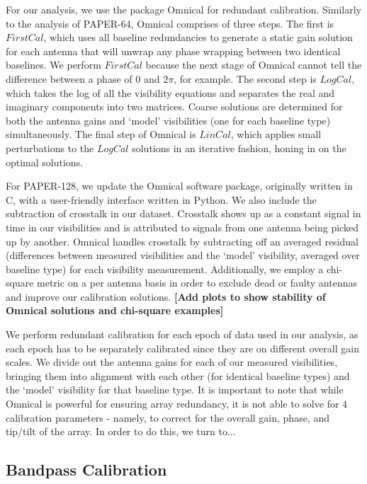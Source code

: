 \documentclass[preprint2,numberedappendix,tighten,twocolappendix]{aastex6}  %
\newcommand{\cc}[1]{{\color{purple} \textbf{[#1]}}}
\begin{document}
For our analysis, we use the package Omnical for redundant calibration. Similarly to the analysis of PAPER-64, Omnical comprises of three steps. The first is $FirstCal$, which uses all baseline redundancies to generate a static gain solution for each antenna that will unwrap any phase wrapping between two identical baselines. We perform $FirstCal$ because the next stage of Omnical cannot tell the difference between a phase of $0$ and $2\pi$, for example. The second step is $LogCal$, which takes the log of all the visibility equations and separates the real and imaginary components into two matrices. Coarse solutions are determined for both the antenna gains and `model' visibilities (one for each baseline type) simultaneously. The final step of Omnical is $LinCal$, which applies small perturbations to the $LogCal$ solutions in an iterative fashion, honing in on the optimal solutions.

For PAPER-128, we update the Omnical software package, originally written in C, with a user-friendly interface written in Python. We also include the subtraction of crosstalk in our dataset. Crosstalk shows up as a constant signal in time in our visibilities and is attributed to signals from one antenna being picked up by another. Omnical handles crosstalk by subtracting off an averaged residual (differences between measured visibilities and the `model' visibility, averaged over baseline type) for each visibility measurement. Additionally, we employ a chi-square metric on a per antenna basis in order to exclude dead or faulty antennas and improve our calibration solutions. \cc{Add plots to show stability of Omnical solutions and chi-square examples}

We perform redundant calibration for each epoch of data used in our analysis, as each epoch has to be separately calibrated since they are on different overall gain scales. We divide out the antenna gains for each of our measured visibilities, bringing them into alignment with each other (for identical baseline types) and the `model' visibility for that baseline type. It is important to note that while Omnical is powerful for ensuring array redundancy, it is not able to solve for $4$ calibration parameters - namely, to correct for the overall gain, phase, and tip/tilt of the array. In order to do this, we turn to...

\subsection{Bandpass Calibration}
\end{document}
